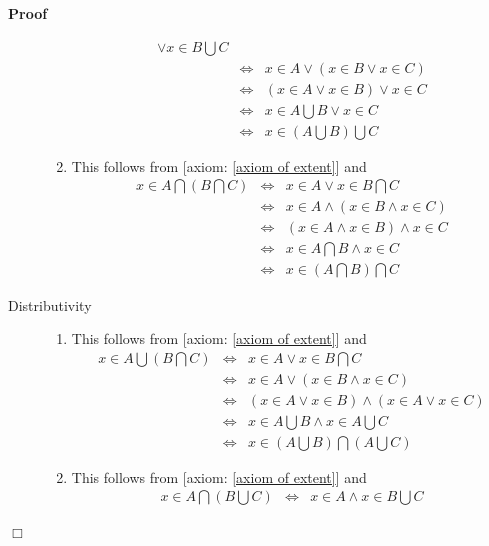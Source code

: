 \documentclass{book}
\newenvironment{proof}{\noindent\textbf{Proof\ }}{\hspace*{\fill}$\Box$\medskip}
\begin{document}
\begin{proof}
\begin{description}
\begin{enumerate}
\begin{eqnarray*}
        \vee x \in B \bigcup C\\
        & \Leftrightarrow & x \in A \vee (x \in B \vee x \in C)\\
        & \Leftrightarrow & (x \in A \vee x \in B) \vee x \in C\\
        & \Leftrightarrow & x \in A \bigcup B \vee x \in C\\
        & \Leftrightarrow & x \in \left( A \bigcup B \right) \bigcup C
      \end{eqnarray*}
      \item This follows from [axiom: \ref{axiom of extent}] and
      \begin{eqnarray*}
        x \in A \bigcap \left( B \bigcap C \right) & \Leftrightarrow & x \in A
        \vee x \in B \bigcap C\\
        & \Leftrightarrow & x \in A \wedge (x \in B \wedge x \in C)\\
        & \Leftrightarrow & (x \in A \wedge x \in B) \wedge x \in C\\
        & \Leftrightarrow & x \in A \bigcap B \wedge x \in C\\
        & \Leftrightarrow & x \in \left( A \bigcap B \right) \bigcap C
      \end{eqnarray*}
    \end{enumerate}
    \item[Distributivity] 
    \begin{enumerate}
      \item This follows from [axiom: \ref{axiom of extent}] and
      \begin{eqnarray*}
        x \in A \bigcup \left( B \bigcap C \right) & \Leftrightarrow & x \in A
        \vee x \in B \bigcap C\\
        & \Leftrightarrow & x \in A \vee (x \in B \wedge x \in C)\\
        & \Leftrightarrow & (x \in A \vee x \in B) \wedge (x \in A \vee x \in
        C)\\
        & \Leftrightarrow & x \in A \bigcup B \wedge x \in A \bigcup C\\
        & \Leftrightarrow & x \in \left( A \bigcup B \right) \bigcap \left( A
        \bigcup C \right)
      \end{eqnarray*}
      \item This follows from [axiom: \ref{axiom of extent}] and
      \begin{eqnarray*}
        x \in A \bigcap \left( B \bigcup C \right) & \Leftrightarrow & x \in A
        \wedge x \in B \bigcup C\\

\end{eqnarray*}
\end{enumerate}
\end{description}
\end{proof}
\end{document}
